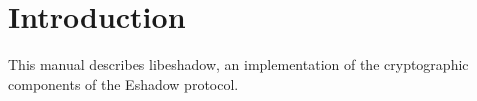 \section{Introduction}

This manual describes \textsf{libeshadow}, an implementation of the cryptographic components of the Eshadow protocol.